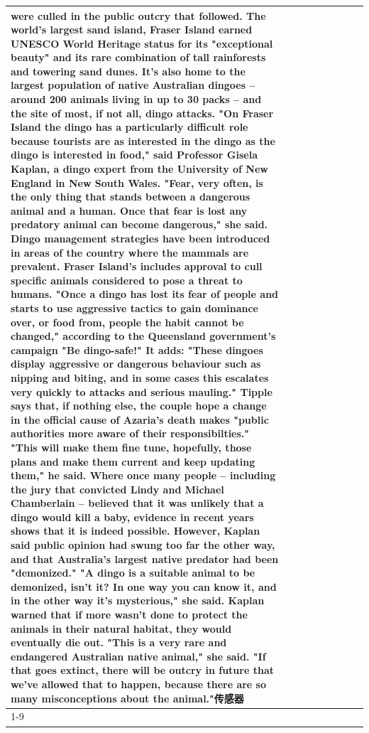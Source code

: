 \begin{table}[H]
\begin{tabular}{lllrlllll}
were culled in the public outcry that followed. The world's largest sand island, Fraser Island earned UNESCO World Heritage status for its "exceptional beauty" and its rare combination of tall rainforests and towering sand dunes. It's also home to the largest population of native Australian dingoes -- around 200 animals living in up to 30 packs -- and the site of most, if not all, dingo attacks. "On Fraser Island the dingo has a particularly difficult role because tourists are as interested in the dingo as the dingo is interested in food," said Professor Gisela Kaplan, a dingo expert from the University of New England in New South Wales. "Fear, very often, is the only thing that stands between a dangerous animal and a human. Once that fear is lost any predatory animal can become dangerous," she said. Dingo management strategies have been introduced in areas of the country where the mammals are prevalent. Fraser Island's includes approval to cull specific animals considered to pose a threat to humans. "Once a dingo has lost its fear of people and starts to use aggressive tactics to gain dominance over, or food from, people the habit cannot be changed," according to the Queensland government's campaign "Be dingo-safe!" It adds: "These dingoes display aggressive or dangerous behaviour such as nipping and biting, and in some cases this escalates very quickly to attacks and serious mauling." Tipple says that, if nothing else, the couple hope a change in the official cause of Azaria's death makes "public authorities more aware of their responsibilties." "This will make them fine tune, hopefully, those plans and make them current and keep updating them," he said. Where once many people -- including the jury that convicted Lindy and Michael Chamberlain -- believed that it was unlikely that a dingo would kill a baby, evidence in recent years shows that it is indeed possible. However, Kaplan said public opinion had swung too far the other way, and that Australia's largest native predator had been "demonized." "A dingo is a suitable animal to be demonized, isn't it? In one way you can know it, and in the other way it's mysterious," she said. Kaplan warned that if more wasn't done to protect the animals in their natural habitat, they would eventually die out. "This is a very rare and endangered Australian native animal," she said. "If that goes extinct, there will be outcry in future that we've allowed that to happen, because there are so many misconceptions about the animal."传感器 \\
\cline{1-9}

\end{tabular}
\end{table}
